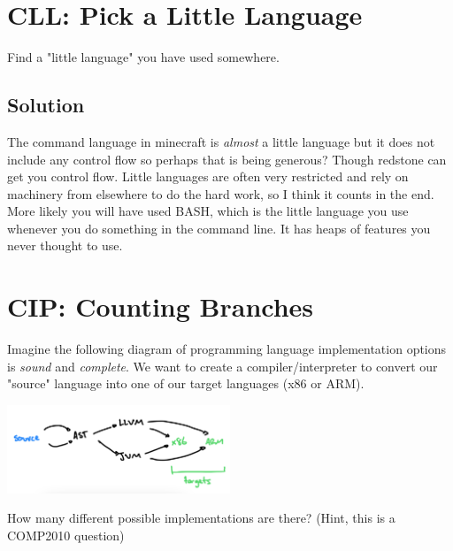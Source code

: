 \documentclass[twoside=false, DIV=14]{scrartcl}
\begin{document}
\section*{CLL: Pick a Little Language}
Find a "little language" you have used somewhere.

\subsection*{Solution}
  The command language in minecraft is \emph{almost} a little language but it does not include any control flow so perhaps that is being generous?  Though redstone can get you control flow.  Little languages are often very restricted and rely on machinery from elsewhere to do the hard work, so I think it counts in the end.  More likely you will have used BASH, which is the little language you use whenever you do something in the command line.  It has heaps of features you never thought to use.

  \section*{CIP: Counting Branches}
Imagine the following diagram of programming language implementation options is \emph{sound} and \emph{complete}.  We want to create a compiler/interpreter to convert our "source" language into one of our target languages (x86 or ARM).
  
\includegraphics[width=0.5\textwidth]{2_paths.jpeg}

How many different possible implementations are there? (Hint, this is a COMP2010 question)
\end{document}
